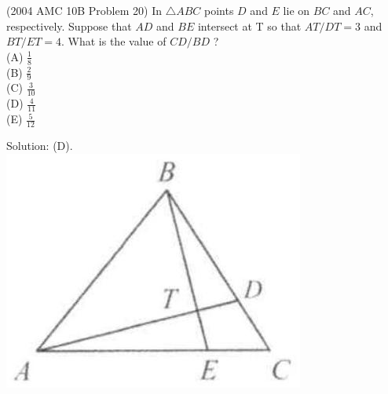 \documentclass{article}
\begin{document}
(2004 AMC 10B Problem 20) In \(\triangle A B C\) points \(D\) and \(E\) lie on \(B C\) and \(A C\), respectively. Suppose that \(A D\) and \(B E\) intersect at T so that \(A T / D T=3\) and \(B T / E T=4\). What is the value of \(C D / B D\) ?\\
(A) \(\frac{1}{8}\)\\
(B) \(\frac{2}{9}\)\\
(C) \(\frac{3}{10}\)\\
(D) \(\frac{4}{11}\)\\
(E) \(\frac{5}{12}\)

Solution: (D).\\
\centering
\includegraphics[width=\textwidth]{images/104.jpg}
\end{document}

